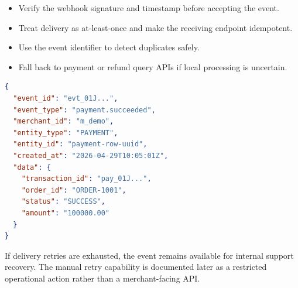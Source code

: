 \begin{itemize}
  \item Verify the webhook signature and timestamp before accepting the event.
  \item Treat delivery as at-least-once and make the receiving endpoint
  idempotent.
  \item Use the event identifier to detect duplicates safely.
  \item Fall back to payment or refund query APIs if local processing is
  uncertain.
\end{itemize}

\begin{lstlisting}[language=json,caption={Webhook event example}]
{
  "event_id": "evt_01J...",
  "event_type": "payment.succeeded",
  "merchant_id": "m_demo",
  "entity_type": "PAYMENT",
  "entity_id": "payment-row-uuid",
  "created_at": "2026-04-29T10:05:01Z",
  "data": {
    "transaction_id": "pay_01J...",
    "order_id": "ORDER-1001",
    "status": "SUCCESS",
    "amount": "100000.00"
  }
}
\end{lstlisting}

If delivery retries are exhausted, the event remains available for internal
support recovery. The manual retry capability is documented later as a
restricted operational action rather than a merchant-facing API.
